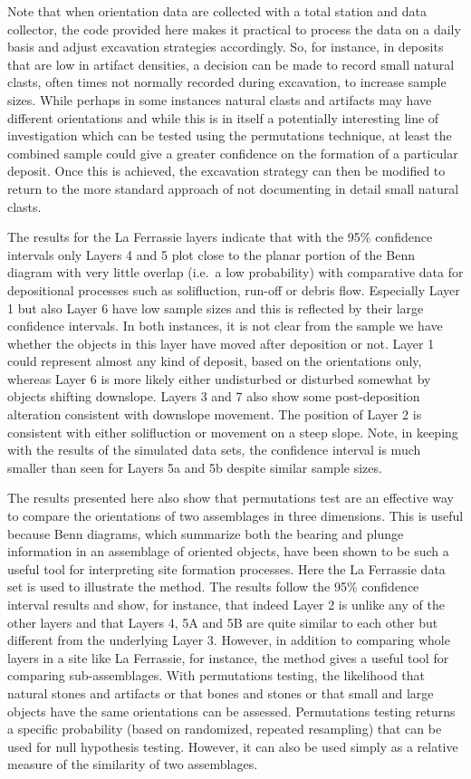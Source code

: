 \documentclass[]{article}
\begin{document}
Note that when orientation data are collected with a total station and
data collector, the code provided here makes it practical to process the
data on a daily basis and adjust excavation strategies accordingly. So,
for instance, in deposits that are low in artifact densities, a decision
can be made to record small natural clasts, often times not normally
recorded during excavation, to increase sample sizes. While perhaps in
some instances natural clasts and artifacts may have different
orientations and while this is in itself a potentially interesting line
of investigation which can be tested using the permutations technique,
at least the combined sample could give a greater confidence on the
formation of a particular deposit. Once this is achieved, the excavation
strategy can then be modified to return to the more standard approach of
not documenting in detail small natural clasts.

The results for the La Ferrassie layers indicate that with the 95\%
confidence intervals only Layers 4 and 5 plot close to the planar
portion of the Benn diagram with very little overlap (i.e.~a low
probability) with comparative data for depositional processes such as
solifluction, run-off or debris flow. Especially Layer 1 but also Layer
6 have low sample sizes and this is reflected by their large confidence
intervals. In both instances, it is not clear from the sample we have
whether the objects in this layer have moved after deposition or not.
Layer 1 could represent almost any kind of deposit, based on the
orientations only, whereas Layer 6 is more likely either undisturbed or
disturbed somewhat by objects shifting downslope. Layers 3 and 7 also
show some post-deposition alteration consistent with downslope movement.
The position of Layer 2 is consistent with either solifluction or
movement on a steep slope. Note, in keeping with the results of the
simulated data sets, the confidence interval is much smaller than seen
for Layers 5a and 5b despite similar sample sizes.

The results presented here also show that permutations test are an
effective way to compare the orientations of two assemblages in three
dimensions. This is useful because Benn diagrams, which summarize both
the bearing and plunge information in an assemblage of oriented objects,
have been shown to be such a useful tool for interpreting site formation
processes. Here the La Ferrassie data set is used to illustrate the
method. The results follow the 95\% confidence interval results and
show, for instance, that indeed Layer 2 is unlike any of the other
layers and that Layers 4, 5A and 5B are quite similar to each other but
different from the underlying Layer 3. However, in addition to comparing
whole layers in a site like La Ferrassie, for instance, the method gives
a useful tool for comparing sub-assemblages. With permutations testing,
the likelihood that natural stones and artifacts or that bones and
stones or that small and large objects have the same orientations can be
assessed. Permutations testing returns a specific probability (based on
randomized, repeated resampling) that can be used for null hypothesis
testing. However, it can also be used simply as a relative measure of
the similarity of two assemblages.
\end{document}
